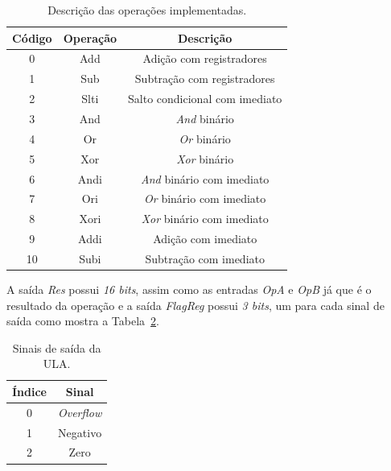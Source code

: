 \documentclass[11pt,a4paper,titlepage]{article}
\begin{document}
\begin{table}[h]
\centering
\begin{tabular}{| c | c | c |}
\hline
Código & Operação & Descrição\\
\hline
0 & Add & Adição com registradores \\
\hline
1 & Sub & Subtração com registradores \\
\hline
2 & Slti & Salto condicional com imediato \\
\hline
3 & And & \textit{And} binário \\
\hline
4 & Or & \textit{Or} binário  \\
\hline
5 & Xor & \textit{Xor} binário  \\
\hline
6 & Andi & \textit{And} binário com imediato \\
\hline
7 & Ori & \textit{Or} binário com imediato \\
\hline
8 & Xori & \textit{Xor} binário com imediato  \\
\hline
9 & Addi & Adição com imediato \\
\hline
10 & Subi & Subtração com imediato \\
\hline
\end{tabular}
\caption{Descrição das operações implementadas.}
\label{tab:ULA}
\end{table}
%

A saída \textit{Res} possui \textit{16 bits}, assim como as entradas \textit{OpA} e \textit{OpB} já que é o resultado da operação e a saída \textit{FlagReg} possui \textit{3 bits}, um para cada sinal de saída como mostra a Tabela~\ref{tab:flags}.

\begin{table}[h]
\centering
\begin{tabular}{| c | c |}
\hline
Índice & Sinal\\
\hline
0 & \textit{Overflow}\\
\hline
1 & Negativo \\
\hline
2 & Zero\\
\hline
\end{tabular}
\caption{Sinais de saída da ULA.}
\label{tab:flags}
\end{table}
%
\end{document}
